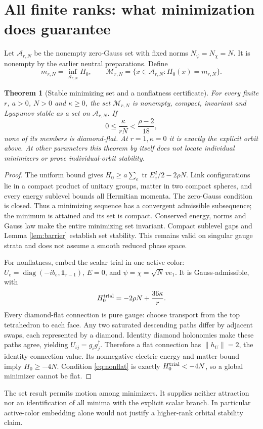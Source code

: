 \documentclass[11pt,a4paper]{article}
\newtheorem{theorem}{Theorem}\newtheorem{lemma}[theorem]{Lemma}\newtheorem{proposition}[theorem]{Proposition}
\newcommand{\id}{\mathbf1}\newcommand{\tr}{\operatorname{tr}}\newcommand{\diag}{\operatorname{diag}}\newcommand{\Rea}{\operatorname{Re}}
\begin{document}
\section{All finite ranks: what minimization does guarantee}
Let $\mathcal A_{r,N}$ be the nonempty zero-Gauss set with fixed norms $N_\psi=N_\chi=N$. It is nonempty by the earlier neutral preparations. Define
\[
m_{r,N}=\inf_{\mathcal A_{r,N}}H_0,\qquad
\mathcal M_{r,N}=\{x\in\mathcal A_{r,N}:H_0(x)=m_{r,N}\}.
\]
\begin{theorem}[Stable minimizing set and a nonflatness certificate]\label{th:set}
For every finite $r$, $a>0$, $N>0$ and $\kappa\geq0$, the set $\mathcal M_{r,N}$ is nonempty, compact, invariant and Lyapunov stable as a set on $\mathcal A_{r,N}$. If
\begin{equation}
0\leq\frac\kappa{rN}<\frac{\rho-2}{18},\label{eq:nonflat}
\end{equation}
none of its members is diamond-flat. At $r=1,\kappa=0$ it is exactly the explicit orbit above. At other parameters this theorem by itself does not locate individual minimizers or prove individual-orbit stability.
\end{theorem}
\begin{proof}
The uniform bound gives
$H_0\geq a\sum_e\tr E_e^2/2-2\rho N$. Link configurations lie in a compact product of unitary groups, matter in two compact spheres, and every energy sublevel bounds all Hermitian momenta. The zero-Gauss condition is closed. Thus a minimizing sequence has a convergent admissible subsequence; the minimum is attained and its set is compact. Conserved energy, norms and Gauss law make the entire minimizing set invariant. Compact sublevel gaps and Lemma \ref{lem:barrier} establish set stability. This remains valid on singular gauge strata and does not assume a smooth reduced phase space.

For nonflatness, embed the scalar trial in one active color:
$U_e=\diag(-ib_e,\id_{r-1})$, $E=0$, and
$\psi=\chi=\sqrt N\,v e_1$. It is Gauss-admissible, with
\[
H_0^{\rm trial}=-2\rho N+\frac{36\kappa}{r}.
\]
Every diamond-flat connection is pure gauge: choose transport from the top tetrahedron to each face. Any two saturated descending paths differ by adjacent swaps, each represented by a diamond. Identity diamond holonomies make these paths agree, yielding $U_{ij}=g_ig_j^\dagger$. Therefore a flat connection has $\|h_U\|=2$, the identity-connection value. Its nonnegative electric energy and matter bound imply $H_0\geq-4N$. Condition \eqref{eq:nonflat} is exactly $H_0^{\rm trial}<-4N$, so a global minimizer cannot be flat.
\end{proof}
The set result permits motion among minimizers. It supplies neither attraction nor an identification of all minima with the explicit scalar branch. In particular active-color embedding alone would not justify a higher-rank orbital stability claim.
\end{document}
